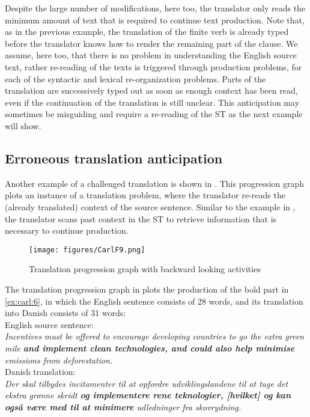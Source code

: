 \documentclass[output=paper]{LSP/langsci}
\begin{document}
Despite the large number of modifications, here too, the translator only reads the minimum amount of text that is required to continue text production. Note that, as in the previous example, the translation of the finite verb is already typed before the translator knows how to render the remaining part of the clause. We assume, here too, that there is no problem in understanding the English source text, rather re-reading of the texts is triggered through production problems, for each of the syntactic and lexical re-organization problems. Parts of the translation are successively typed out as soon as enough context has been read, even if the continuation of the translation is still unclear. This anticipation may sometimes be misguiding and require a re-reading of the ST as the next example will show.

\subsection{Erroneous translation anticipation}\label{sec:carl:4.4}
\largerpage
Another example of a challenged translation is shown in . This progression graph plots an instance of a translation problem, where the translator re-reads the (already translated) context of the source sentence. Similar to the example in , the translator scans past context in the ST to retrieve information that is necessary to continue production. 

\begin{figure}
\texttt{[image: figures/CarlF9.png]}
\caption{Translation progression graph with backward looking activities}
\label{fig:carl:9}
\end{figure} 

The translation progression graph in  plots the production of the bold part in \ref{ex:carl:6}, in which the English sentence consists of 28 words, and its translation into Danish consists of 31 words:\\

\ea\label{ex:carl:6}
English source sentence:\\
\textit{Incentives must be offered to encourage developing countries to go the extra green mile \textbf{and implement clean technologies, and could also help minimise} emissions from deforestation.}\\
Danish translation:\\
\textit{Der skal tilbydes incitamenter til at opfordre udviklingslandene til at tage det ekstra grønne skridt \textbf{og implementere rene teknologier, [hvilket] og kan også være med til at minimere} udledninger fra skovrydning.} 
\z
\end{document}
